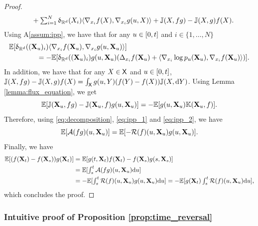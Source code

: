\begin{proof}
\begin{align}
                      & \qquad \textstyle + \sum_{i=1}^N \updelta_{\mathbb{R}^d}(X_i) \langle \nabla_{x_i} f(X), \nabla_{x_i} g(u,X) \rangle + \mathbb{J}(X, fg) - \mathbb{J}(X, g)f(X). \label{eq:decomposition}
    \end{align}
    Using A\ref{assum:ipp}, we have that for any $u \in [ 0,t ]$ and $i \in \{1, \dots, N\}$
    \begin{align}
      &\mathbb{E}[\updelta_{\mathbb{R}^d}((\mathbf{X}_u)_i) \langle \nabla_{x_i} f(\mathbf{X}_u), \nabla_{x_i} g(u, \mathbf{X}_u) \rangle] \\
      & \qquad \qquad = -  \mathbb{E}[\updelta_{\mathbb{R}^d}((\mathbf{X}_u)_i) g(u, \mathbf{X}_u) (\Delta_{x_i} f(\mathbf{X}_u) + \langle \nabla_{x_i} \log p_u(\mathbf{X}_u), \nabla_{x_i} f(\mathbf{X}_u) \rangle)] . \label{eq:ipp_1}
    \end{align}
    In addition, we have that for any $X \in \mathsf{X}$ and $u \in [ 0,t ]$,
    $\mathbb{J}(X,fg) - \mathbb{J}(X,g)f(X) = \int_{\mathsf{X}} g(u,Y)(f(Y) - f(X)) \mathbb{J}(X, \mathrm{d}
    Y)$. Using Lemma \ref{lemma:flux_equation}, we get
        \begin{equation}
      \mathbb{E}[\mathbb{J}(\mathbf{X}_u, fg) - \mathbb{J}(\mathbf{X}_u,f)g(u,\mathbf{X}_u)] = -\mathbb{E}[g(u,\mathbf{X}_u) \mathbb{K}(\mathbf{X}_u,f)]\textstyle. \label{eq:ipp_2}
    \end{equation}
    Therefore, using \eqref{eq:decomposition}, \eqref{eq:ipp_1} and \eqref{eq:ipp_2}, we have 
    \begin{equation}
      \mathbb{E}[{\mathcal{A}}(fg)(u, \mathbf{X}_u)] = \mathbb{E}[-\mathcal{R}(f)(u, \mathbf{X}_u)g(u, \mathbf{X}_u)]. 
    \end{equation}
    Finally, we have
    \begin{align}
      \mathbb{E}[(f(\mathbf{X}_t) -f(\mathbf{X}_s))g(\mathbf{X}_t)] &= \mathbb{E}[g(t, \mathbf{X}_t)f(\mathbf{X}_t) -f(\mathbf{X}_s)g(s, \mathbf{X}_s)] \\
                                                  &\textstyle = \mathbb{E}[\int_s^t {\mathcal{A}}(fg)(u, \mathbf{X}_u) \mathrm{d} u ] \\
      &\textstyle = - \mathbb{E}[\int_s^t \mathcal{R}(f)(u, \mathbf{X}_u)g(u, \mathbf{X}_u) \mathrm{d} u ] = - \mathbb{E}[g(\mathbf{X}_t) \int_s^t \mathcal{R}(f)(u, \mathbf{X}_u) \mathrm{d} u ] , 
    \end{align}
    which concludes the proof.
  \end{proof}















\subsubsection{Intuitive proof of Proposition \ref{prop:time_reversal}}
\label{sec:tddm-intuitive_time_reversal}

